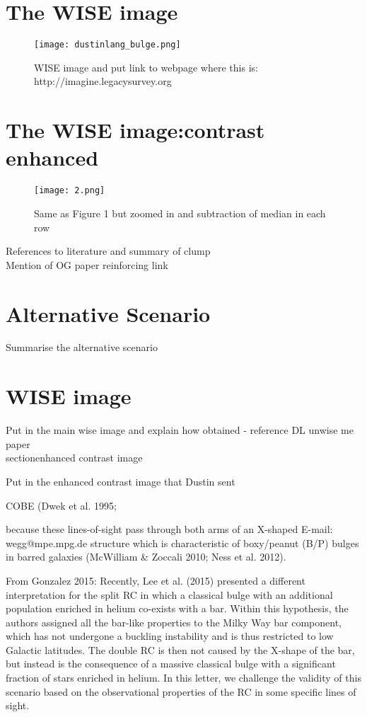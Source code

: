 \documentclass[12pt, preprint]{aastex}
\begin{document}
\section{The WISE image}

\begin{figure}[h!]
\centering
        \texttt{[image: dustinlang\_bulge.png]}
\caption{WISE image and put link to webpage where this is: http://imagine.legacysurvey.org}
\label{fig:xbulge}
\end{figure}

\section{The WISE image:contrast enhanced}

\begin{figure}[h!]
\centering
        \texttt{[image: 2.png]}
\caption{Same as Figure 1 but zoomed in and subtraction of median in each row }
\label{fig:filt}
\end{figure}



References to literature and summary of clump \\
Mention of OG paper reinforcing link \\

\section{Alternative Scenario} 

Summarise the alternative scenario \\

\section{WISE image} 

Put in the main wise image and explain how obtained - reference DL unwise me paper \\

section{enhanced contrast image} 

Put in the enhanced contrast image that Dustin sent 

COBE (Dwek et al. 1995;

because these lines-of-sight pass through both arms of an X-shaped
 E-mail: wegg@mpe.mpg.de
structure which is characteristic of boxy/peanut (B/P) bulges
in barred galaxies (McWilliam & Zoccali 2010; Ness et al.
2012).

From Gonzalez 2015: Recently, Lee et al. (2015) presented a different interpretation
for the split RC in which a classical bulge with an additional
population enriched in helium co-exists with a bar. Within this
hypothesis, the authors assigned all the bar-like properties to the
Milky Way bar component, which has not undergone a buckling
instability and is thus restricted to low Galactic latitudes.
The double RC is then not caused by the X-shape of the bar, but
instead is the consequence of a massive classical bulge with a
significant fraction of stars enriched in helium. In this letter, we
challenge the validity of this scenario based on the observational
properties of the RC in some specific lines of sight.
\end{document}
